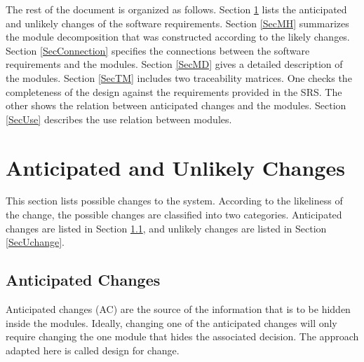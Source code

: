 \documentclass[12pt, titlepage]{article}
\begin{document}
The rest of the document is organized as follows. Section
\ref{SecChange} lists the anticipated and unlikely changes of the software
requirements. Section \ref{SecMH} summarizes the module decomposition that
was constructed according to the likely changes. Section \ref{SecConnection}
specifies the connections between the software requirements and the
modules. Section \ref{SecMD} gives a detailed description of the
modules. Section \ref{SecTM} includes two traceability matrices. One checks
the completeness of the design against the requirements provided in the SRS. The
other shows the relation between anticipated changes and the modules. Section
\ref{SecUse} describes the use relation between modules.

\section{Anticipated and Unlikely Changes} \label{SecChange}

This section lists possible changes to the system. According to the likeliness
of the change, the possible changes are classified into two
categories. Anticipated changes are listed in Section \ref{SecAchange}, and
unlikely changes are listed in Section \ref{SecUchange}.

\subsection{Anticipated Changes} \label{SecAchange}

Anticipated changes (AC) are the source of the information that is to be hidden
inside the modules. Ideally, changing one of the anticipated changes will only
require changing the one module that hides the associated decision. The approach
adapted here is called design for
change.
\end{document}
